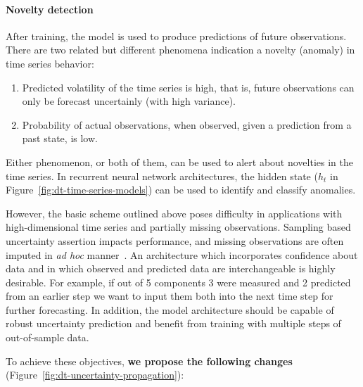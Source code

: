 \documentclass[runningheads]{llncs}
\begin{document}
\paragraph{Novelty detection} After training, the model is used
to produce predictions of future observations. There are two
related but different phenomena indication a novelty (anomaly)
in time series behavior:
\begin{enumerate}
\item Predicted volatility of the time series is high, that is, future
observations can only be forecast uncertainly (with high variance). 
\item Probability of actual observations, when observed, given a prediction
from a past state, is low.
\end{enumerate}
Either phenomenon, or both of them, can be used to alert about
novelties in the time series. In recurrent neural network
architectures, the hidden state ($h_t$ in
Figure~\ref{fig:dt-time-series-models}) can be used to identify
and classify anomalies.

However, the basic scheme outlined above poses difficulty in
applications with high-dimensional time series and partially
missing observations. Sampling based uncertainty assertion
impacts performance, and missing observations are often imputed
in \textit{ad hoc} manner~\cite{}. An architecture which
incorporates confidence about data and in which observed and
predicted data are interchangeable is  highly desirable. For
example, if out of 5 components 3 were measured and 2 predicted
from an earlier step we want to input them both into the next
time step for further forecasting. In addition, the model
architecture should be capable of robust uncertainty prediction
and benefit from training with multiple steps of out-of-sample
data.

To achieve these objectives, \textbf{we propose the following
changes} (Figure~\ref{fig:dt-uncertainty-propagation}):
\end{document}
